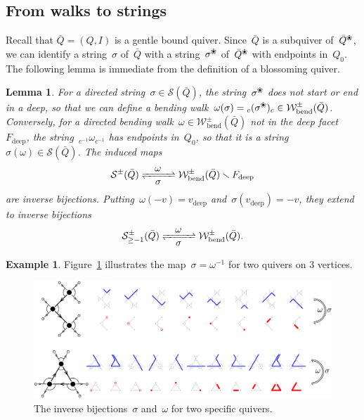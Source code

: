 \documentclass{memo-l}
\newtheorem{lemma}[theorem]{Lemma}
\theoremstyle{definition}
\newtheorem{example}[theorem]{Example}
\newcommand{\ssm}{\smallsetminus} %
\newcommand{\fref}[1]{Figure~\ref{#1}} %
\newcommand{\blossom}{^\text{\ding{96}}} %
\newcommand{\strings}{\mathcal{S}} %
\newcommand{\bendingWalks}{\mathcal{W}_\mathrm{bend}} %
\newcommand{\deep}{\mathrm{deep}} %
\begin{document}
\subsection{From walks to strings}
\label{subsec:walks2strings}

Recall that $\bar Q = (Q,I)$ is a gentle bound quiver.
Since~$\bar Q$ is a subquiver of~$\bar Q\blossom$, we can identify a string~$\sigma$ of~$\bar Q$ with a string~$\sigma\blossom$ of~$\bar Q\blossom$ with endpoints in~$Q_0$.
The following lemma is immediate from the definition of a blossoming quiver.

\begin{lemma}
\label{lem:bijections-STTC-NKC}
For a directed string~$\sigma \in \strings(\bar Q)$, the string~$\sigma\blossom$ does not start or end in a deep, so that we can define a bending walk~$\omega(\sigma) = \phantom{}_c (\sigma\blossom) \phantom{}_c \in \bendingWalks^\pm(\bar Q)$.
Conversely, for a directed bending walk~$\omega \in \bendingWalks^\pm(\bar Q)$ not in the deep facet~$F_\deep$, the string~$\phantom{}_{c^{-1}} \omega \phantom{}_{c^{-1}}$ has endpoints in~$Q_0$, so that it is a string~$\sigma(\omega) \in \strings(\bar Q)$.
The induced maps
\[
\strings^\pm(\bar Q) \xrightleftharpoons[\quad\mbox{$\sigma$}\;\quad]{\mbox{$\omega$}} \bendingWalks^\pm(\bar Q) \ssm F_\deep
\]
are inverse bijections.
Putting~$\omega(-v) = v_\deep$ and~$\sigma(v_\deep) = -v$, they extend to inverse bijections
\[
\strings_{\ge-1}^\pm(\bar Q) \xrightleftharpoons[\quad\mbox{$\sigma$}\;\quad]{\mbox{$\omega$}} \bendingWalks^\pm(\bar Q).
\]
\end{lemma}

\begin{example}
\label{exm:exmBijectionStringsWalks1}
\fref{fig:exmBijectionStringsWalks1} illustrates the map~$\sigma = \omega^{-1}$ for two quivers on $3$ vertices.

\begin{figure}[t]
	\capstart
	\centerline{\includegraphics[scale=.5]{exmBijectionStringsWalks1}}
	\caption{The inverse bijections~$\sigma$ and~$\omega$ for two specific quivers.}
	\label{fig:exmBijectionStringsWalks1}
\end{figure}
\end{example}
\end{document}
